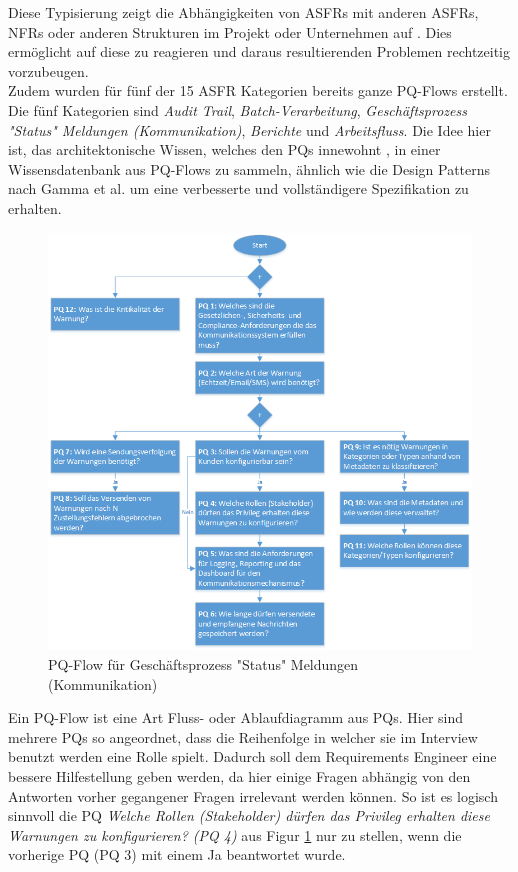 Diese Typisierung zeigt die Abhängigkeiten von ASFRs mit anderen ASFRs, NFRs oder anderen Strukturen im Projekt oder Unternehmen auf \cite{Ros02}. Dies ermöglicht auf diese zu reagieren und daraus resultierenden Problemen rechtzeitig vorzubeugen. \\

Zudem wurden für fünf der 15 ASFR Kategorien bereits ganze PQ-Flows erstellt. Die fünf Kategorien sind \textit{Audit Trail}, \textit{Batch-Verarbeitung}, \textit{Geschäftsprozess "Status" Meldungen (Kommunikation)}, \textit{Berichte} und \textit{Arbeitsfluss}. Die Idee hier ist, das architektonische Wissen, welches den PQs innewohnt \cite{Ros02}, in einer Wissensdatenbank aus PQ-Flows zu sammeln, ähnlich wie die Design Patterns nach Gamma et al. \cite{Ros03} um eine verbesserte und vollständigere Spezifikation zu erhalten. \\

\begin{figure}[h]
	\centering
	\includegraphics[scale=0.45]{pqflow_communication.png} 
	\caption{PQ-Flow für Geschäftsprozess "Status" Meldungen (Kommunikation) \cite{Ros01}}\label{fig_pqflow_communication}
\end{figure}

Ein PQ-Flow ist eine Art Fluss- oder Ablaufdiagramm aus PQs. Hier sind mehrere PQs so angeordnet, dass die Reihenfolge in welcher sie im Interview benutzt werden eine Rolle spielt. Dadurch soll dem Requirements Engineer eine bessere Hilfestellung geben werden, da hier einige Fragen abhängig von den Antworten vorher gegangener Fragen irrelevant werden können. So ist es logisch sinnvoll die PQ \textit{Welche Rollen (Stakeholder) dürfen das Privileg erhalten diese Warnungen zu konfigurieren? (PQ 4)} aus Figur \ref{fig_pqflow_communication} nur zu stellen, wenn die vorherige PQ (PQ 3) mit einem Ja beantwortet wurde. \\

